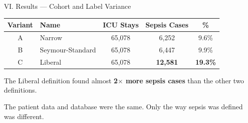 \begin{frame}{VI. Results --- Cohort and Label Variance}
\begin{center}\tablestyle
\begin{tabular}{clccc}
\toprule
\textbf{Variant} & \textbf{Name} & \textbf{ICU Stays}
  & \textbf{Sepsis Cases} & \textbf{\%} \\
\midrule
A & Narrow           & 65,078 & 6,252              & 9.6\% \\
B & Seymour-Standard & 65,078 & 6,447              & 9.9\% \\
C & Liberal          & 65,078 & \textbf{12,581}     & \textbf{19.3\%} \\
\bottomrule
\end{tabular}
\end{center}

\vspace{8pt}
The Liberal definition found almost \textbf{2$\times$ more sepsis cases}
than the other two definitions.

\vspace{4pt}
The patient data and database were the same. Only the way sepsis was defined
was different.
\end{frame}


